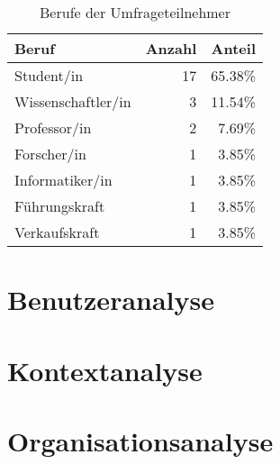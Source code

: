 \begin{table}[ht]
  \begin{center}
    \begin{tabular}{lrr}
      \textbf{Beruf}  & \textbf{Anzahl} & \textbf{Anteil}\\ \hline
      Student/in         & 17 & 65.38\% \\
      Wissenschaftler/in &  3 & 11.54\% \\
      Professor/in       &  2 &  7.69\% \\
      Forscher/in        &  1 &  3.85\% \\
      Informatiker/in    &  1 &  3.85\% \\
      Führungskraft      &  1 &  3.85\% \\
      Verkaufskraft      &  1 &  3.85\% \\
    \end{tabular}
    \caption{Berufe der Umfrageteilnehmer}
    \label{table:berufe}
  \end{center}
\end{table}%

\section{Benutzeranalyse}\label{sec:user_ana}


\section{Kontextanalyse}\label{sec:context_ana}


\section{Organisationsanalyse}\label{sec:orga_ana}

